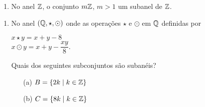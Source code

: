 \documentclass{beamer}
\begin{document}
    \begin{frame}
        \begin{exemplos}
            \begin{enumerate}[label={\arabic*})]
                \conti

                \item No anel $\mathbb{Z}$, \pause o conjunto $m\mathbb{Z}$, $m > 1$  um subanel de $\mathbb{Z}$.\pause

                \vspace{5cm}
            \end{enumerate}
        \end{exemplos}
    \end{frame}

    \begin{frame}
        \begin{exemplos}
            \begin{enumerate}[label={\arabic*})]
                \conti

                \item No anel $(\mathbb{Q}, \star, \odot)$ \pause onde as opera\c{c}\~oes $\star$ e $\odot$ em $\mathbb{Q}$ definidas por\pause
                \begin{center}
                    $x \star y = x + y - 8$\\\pause
                    $x \odot y = x + y - \dfrac{xy}{8}.$\pause
                \end{center}
                Quais dos seguintes subconjuntos s\~ao suban\'eis?\pause
                \begin{enumerate}
                    \item[(a)] $B = \{2k \mid k \in \mathbb{Z}\}$\pause

                    \vspace{.5cm}

                    \item[(b)] $C = \{8k \mid k \in \mathbb{Z}\}$\pause
                    \vspace{.5cm}
                \end{enumerate}
            \end{enumerate}
        \end{exemplos}
    \end{frame}
\end{document}
